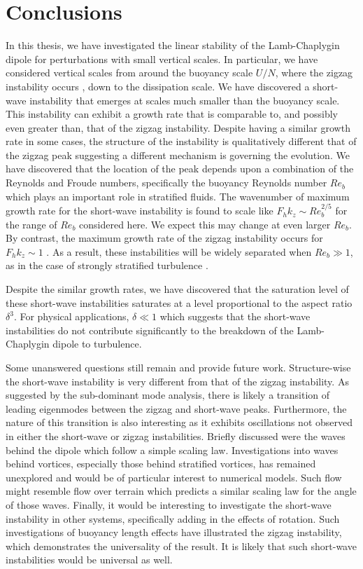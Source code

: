 \chapter{Conclusions}

In this thesis, we have investigated the linear stability of the Lamb-Chaplygin dipole for perturbations with small vertical scales. In particular, we have considered vertical scales from around the buoyancy scale $U/N$, where the zigzag instability occurs \cite{bc2000c,bc2001,waitebartello2004,waite2011}, down to the dissipation scale. We have discovered a short-wave instability that emerges at scales much smaller than the buoyancy scale. This instability can exhibit a growth rate that is comparable to, and possibly even greater than, that of the zigzag instability. Despite having a similar growth rate in some cases, the structure of the instability is qualitatively different that of the zigzag peak suggesting a different mechanism is governing the evolution.  We have discovered that the location of the peak depends upon a combination of the Reynolds and Froude numbers, specifically the buoyancy Reynolds number $Re_{b}$ which plays an important role in stratified fluids. The wavenumber of maximum growth rate for the short-wave instability is found to scale like $F_{h}k_{z}\sim Re_{b}^{2/5}$ for the range of $Re_{b}$ considered here. We expect this may change at even larger $Re_{b}$. By contrast, the maximum growth rate of the zigzag instability occurs for $F_{h}k_{z}\sim 1$ \cite{bc2000b}. As a result, these instabilities will be widely separated when $Re_{b}\gg 1$, as in the case of strongly stratified turbulence \cite{brethouwer2007}.

Despite the similar growth rates, we have discovered that the saturation level of these short-wave instabilities saturates at a level proportional to the aspect ratio $\delta^{3}$. For physical applications, $\delta \ll 1$ which suggests that the short-wave instabilities do not contribute significantly to the breakdown of the Lamb-Chaplygin dipole to turbulence.

Some unanswered questions still remain and provide future work. Structure-wise the short-wave instability is very different from that of the zigzag instability. As suggested by the sub-dominant mode analysis, there is likely a transition of leading eigenmodes between the zigzag and short-wave peaks. Furthermore, the nature of this transition is also interesting as it exhibits oscillations not observed in either the short-wave or zigzag instabilities. Briefly discussed were the waves behind the dipole which follow a simple scaling law. Investigations into waves behind vortices, especially those behind stratified vortices, has remained unexplored and would be of particular interest to numerical models. Such flow might resemble flow over terrain which predicts a similar scaling law for the angle of those waves. Finally, it would be interesting to investigate the short-wave instability in other systems, specifically adding in the effects of rotation. Such investigations of buoyancy length effects have illustrated the zigzag instability, which demonstrates the universality of the result. It is likely that such short-wave instabilities would be universal as well. 

